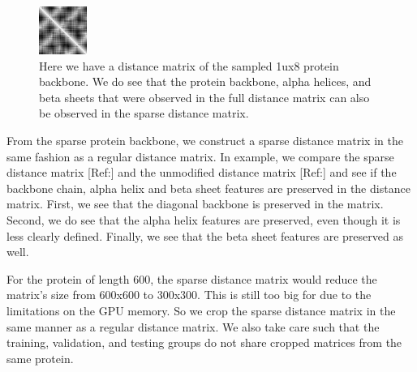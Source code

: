 \documentclass[12pt, a4paper, twocolumn, fullpage]{article}
\theoremstyle{plain}
\theoremstyle{definition}
\theoremstyle{remark}
\begin{document}
\begin{figure}[h]
    \centering
    \includegraphics[width=\linewidth]{1ux8pdbSparseDistM}
    \caption{Here we have a distance matrix of the sampled 1ux8 protein backbone. We do see that the protein backbone, alpha helices, and beta sheets that were observed in the full distance matrix can also be observed in the sparse distance matrix. }
    \label{1ux8pdbSparseDistM}
\end{figure}

From the sparse protein backbone, we construct a sparse distance matrix in the same fashion as a regular distance matrix. In example, we compare the sparse distance matrix [Ref:] and the unmodified distance matrix [Ref:] and see if the backbone chain, alpha helix and beta sheet features are preserved in the distance matrix. First, we see that the diagonal backbone is preserved in the matrix. Second, we do see that the alpha helix features are preserved, even though it is less clearly defined. Finally, we see that the beta sheet features are preserved as well.

For the protein of length 600, the sparse distance matrix would reduce the matrix's size from 600x600 to 300x300. This is still too big for due to the limitations on the GPU memory. So we crop the sparse distance matrix in the same manner as a regular distance matrix. We also take care such that the training, validation, and testing groups do not share cropped matrices from the same protein.
\end{document}
